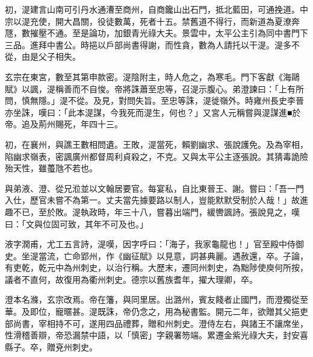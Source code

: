 \begin{pinyinscope}
 初，湜建言山南可引丹水通漕至商州，自商鑱山出石門，抵北藍田，可通挽道。中宗以湜充使，開大昌關，役徒數萬，死者十五。禁舊道不得行，而新道為夏潦奔豗，數摧壓不通。至是論功，加銀青光祿大夫。景雲中，太平公主引為同中書門下三品。進拜中書公。時挹以戶部尚書得謝，而性貪，數為人請托以干湜。湜多不從，由是父子相失。



 玄宗在東宮，數至其第申款密。湜陰附主，時人危之，為寒毛。門下客獻《海鷗賦》以諷，湜稱善而不自悛。帝將誅蕭至忠等，召湜示腹心。弟澄諫曰：「上有所問，慎無隱。」湜不從。及見，對問失旨。至忠等誅，湜徙嶺外。時雍州長史李晉亦坐誅，嘆曰：「此本湜謀，今我死而湜生，何也？」又宮人元稱嘗與湜謀進■於帝。追及荊州賜死，年四十三。



 初，在襄州，與譙王數相問遺。王敗，湜當死，賴劉幽求、張說護免。及為宰相，陷幽求嶺表，密諷廣州都督周利貞殺之，不克。又與太平公主逐張說。其猜毒詭險殆天性，雖蠆虺不若也。



 與弟液、澄、從兄涖並以文翰居要官。每宴私，自比東晉王、謝。嘗曰：「吾一門入仕，歷官未嘗不為第一。丈夫當先據要路以制人，豈能默默受制於人哉！」故進趣不已，至於敗。湜執政時，年三十八，嘗暮出端門，緩轡諷詩。張說見之，嘆曰：「文與位固可致，其年不可及也。」



 液字潤甫，尤工五言詩，湜嘆，因字呼曰：「海子，我家龜龍也！」官至殿中侍御史。坐湜當流，亡命郢州，作《幽征賦》以見意，詞甚典麗。遇赦還，卒。子論，有吏乾，乾元中為州刺史，以治行稱。大歷末，遷同州刺史，為黜陟使庾何所按，議者不直何，故復用為衢州刺史。德宗以舊族耆年，擢大理卿，卒。



 澄本名滌，玄宗改焉。帝在籓，與同里居。出潞州，賓友餞者止國門，而澄獨從至華。及即位，寵暱甚。湜既誅，帝仍念之，用為秘書監。開元二年，欲贈其父挹吏部尚書，宰相持不可，遂用四品禮葬，贈和州刺史。澄侍左右，與諸王不讓席坐，性滑稽善辯，帝恐漏禁中語，以「慎密」字親署笏端。累遷金紫光祿大夫，封安喜縣子。卒，贈兗州刺史。



\end{pinyinscope}